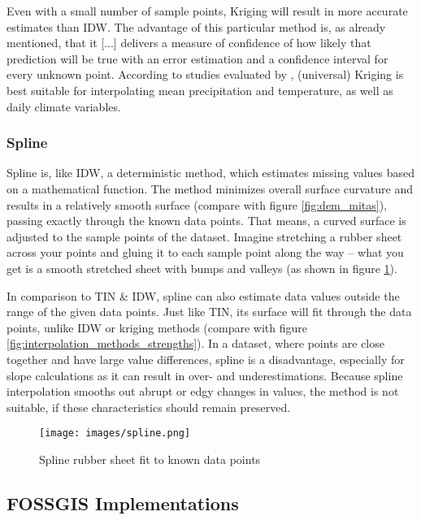 Even with a small number of sample points, Kriging will result in more accurate estimates than IDW. \cite{lam_spatial_2009} The advantage of this particular method is, as already mentioned, that it \ldq{}[...] delivers a measure of confidence of how likely that prediction will be true\rdq{} with an error estimation and a confidence interval for every unknown point. \cite{lam_spatial_2009} According to studies evaluated by \citeauthor{hofstra_comparison_2008}, (universal) Kriging is best suitable for interpolating mean precipitation and temperature, as well as daily climate variables. 

\subsubsection{Spline}

Spline is, like IDW, a deterministic method, which estimates missing values based on a mathematical function. The method minimizes overall \ldq{}surface curvature\rdq{} and results in a relatively smooth surface (compare with figure \ref{fig:dem_mitas}), passing exactly through the known data points. \cite{samanta_interpolation_2012} That means, a curved surface is adjusted to the sample points of the dataset. \ldq{}Imagine stretching a rubber sheet across your points and gluing it to each sample point along the way -- what you get is a smooth stretched sheet with bumps and valleys\rdq{} (as shown in figure \ref{fig:spline}). \cite{wasser_going_2020}

In comparison to TIN \& IDW, spline can also estimate data values outside the range of the given data points. Just like TIN, its surface will fit through the data points, unlike IDW or kriging methods (compare with figure \ref{fig:interpolation_methods_strengths}). In a dataset, where points are close together and have large value differences, spline is a disadvantage, especially for slope calculations as it can result in over- and underestimations. \cite{wasser_going_2020} Because spline interpolation smooths out abrupt or \ldq{}edgy\rdq{} changes in values, the method is not suitable, if these characteristics should remain preserved.

\begin{figure}
	\centering
	\texttt{[image: images/spline.png]}
	\caption{Spline \ldq{}rubber sheet\rdq{} fit to known data points \cite{albrecht_spline_2005}}
	\label{fig:spline}
\end{figure}


\subsection{FOSSGIS Implementations}

